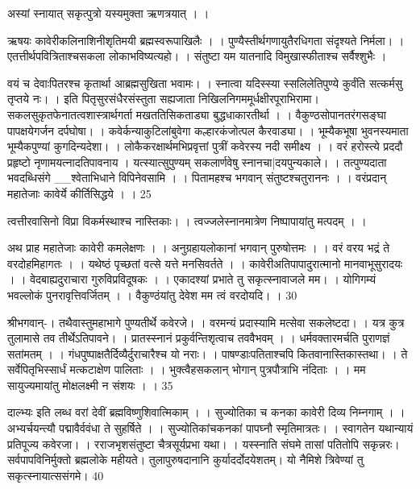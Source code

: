  अस्यां स्नायात् सकृत्पुत्रो यस्यमुक्ता ऋणत्रयात् ।
।

ऋषयः
कावेरीकलिनाशिनीशृतिमयी ब्रह्मस्वरूपाखिलैः ।
।
 पुण्यैस्तीर्थगणायुतैरधिगता संदृश्यते निर्मला।
 ।
 एतत्तीर्थपवित्रिताश्चसकला लोकाभविष्यत्यहो।
 ।
 संतुष्टा यम यातनादि विमुखास्फीताश्च सर्वैश्शुभैः ।
 
वयं च देवाःपितरश्च कृतार्था आब्रह्मसुखिता भवामः।
।
 स्नात्वा यदिस्स्या स्सलिलेतिपुण्ये
कुर्वंति सत्कर्मसु तृप्तये नः।
।
 इति पितृसुरसंधैरसंस्तुता सह्यजाता
निखिलनिगममूर्धक्षीरपूराभिरामा।
 सकलसुकृतफेनातत्वशास्त्रार्थगर्ता
मखततिसिकताड्या बुद्धधाकारतीर्था ।
।
 वैकुण्ठसोपानतरंगसङ्घा पापक्षयेगर्जन दर्पघोषा।
 ।
 कवेर्कन्याकुटिलांबुवेगा
कल्हारकंजोत्पल कैरवाड्या।
।
 भूम्यैकभूषा भुवनस्यमाता
भूम्यैकपुण्यां कुगदिन्यदेशा।
।
 लोकैकरक्षार्थमभिप्रवृत्तां पुत्रीं कवेरस्य नदी समीक्ष्य ।
 ।
 वरं हरोस्त्ये प्रददौ प्रहृष्टो नृणामयत्नादतिपावनाय ।
 यत्स्यात्सुपुण्यम्
सकलार्णवेषु स्नानचा|दयपुन्यकाले।
।
 तत्पुण्यदाता भवदब्धिसंगे
__श्वेताभिधाने विपिनेवसामि ।
।
 पितामहश्च भगवान् संतुष्टश्चतुराननः ।
 ।
 वरंप्रदान् महातेजाः कावेर्ये कीर्तिसिद्धये ।
 ।
 25

  त्वत्तीरवासिनो विप्रा विकर्मस्थाश्च नास्तिकाः।
 ।
 त्वज्जलेस्नानमात्रेण निष्पापायांतु मत्पदम् ।
 ।

अथ प्राह महातेजाः कावेरी कमलेक्षणः ।
।
 अनुग्रहायलोकानां भगवान् पुरुषोत्तमः ।
 ।
 वरं वरय भद्रं ते वरदोहमिहागतः ।
 ।
 यथेष्ठं पृच्छतां वत्से यत्ते मनसिवर्तते ।
 ।
 कावेरीअतिपापादुरात्मानो मानवाभूसुरादयः ।
 ।
 वेदबाह्यदुराचारा गुरुविप्रविदूषकः ।
 ।
 एकादश्यां प्रभाते तु सकृत्स्नावाजले मम।
 ।
 योगिगम्यं भवल्लोकं पुनरावृत्तिवर्जितम् ।
 ।
 वैकुण्ठंयांतु देवेश मम त्वं वरदोयदि।
 ।
 30

  श्रीभगवान्-।
 तथैवास्तुमहाभागे पुण्यतीर्थे कवेरजे।
 ।
 वरमन्यं प्रदास्यामि मत्सेवा सकलेष्टदा।
 ।
 यत्र कुत्र तुलामासे तव तीर्थेऽतिपावने।
 ।
 प्रातस्स्नानं प्रकुर्वन्तिशृत्वाच तववैभवम् ।
 ।
 धर्मवक्तारमर्चति पुराणज्ञं सतांमतम् ।
 ।
 गंधपुष्पाक्षतैर्दिव्यैर्दुराचारैश्च यो नराः।
 ।
 पाषण्डाःपतिताश्चपि कितवानास्तिकास्तथा।
 ।
 ते सर्वेपितृभिस्सार्धं मत्कटाक्षेण पालिताः ।
 ।
 भुक्त्वैहसकलान् भोगान् पुत्रपौत्राभि नंदिताः ।
 ।
 मम सायुज्यमायांतु मोक्षलक्ष्मी न संशयः ।
 ।
 35

  दाल्भ्यः
इति लब्ध वरां देवीं ब्रह्मविष्णुशिवात्मिकाम् ।
।
 सुज्योतिका च कनका कावेरी दिव्य निम्नगाम् ।
 ।
 अभ्यर्चयन्त्यौ पद्मावैर्ववंधा ते सुहर्षिते ।
 ।
 सुज्योतिकांचकनकां पापघ्नौ स्मृतिमात्रतः।
 ।
 स्वागतेन यथान्यायं प्रतिपूज्य कवेरजा।
 ।
 रराजभृशसंतुष्टा चैत्रसूर्यप्रभा यथा।
 ।
 यस्स्नाति संघमे तासां पतितोपि सकृन्नरः।
 सर्वपापविनिर्मुक्तो ब्रह्मलोके महीयते।
 तुलापुरुषदानानि कुर्यादर्दोदयेशतम्।
 यो नैमिशे त्रिवेण्यां तु सकृत्स्नायात्ससंगमे।
 40

